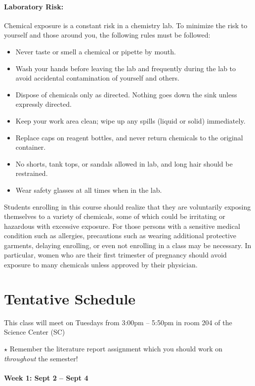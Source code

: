 \documentclass[12pt, letterpaper]{article}
\begin{document}
\paragraph{Laboratory Risk:}
Chemical exposure is a constant risk in a chemistry lab. To minimize the risk to yourself and those around you, the following rules must be followed:
\begin{itemize}
	\item Never taste or smell a chemical or pipette by mouth.
	\item Wash your hands before leaving the lab and frequently during the lab to avoid accidental contamination of yourself and others.
	\item Dispose of chemicals only as directed. Nothing goes down the sink unless expressly directed.
	\item Keep your work area clean; wipe up any spills (liquid or solid) immediately.
	\item Replace caps on reagent bottles, and never return chemicals to the original container.
	\item No shorts, tank tops, or sandals allowed in lab, and long hair should be restrained.
	\item Wear safety glasses at all times when in the lab.
\end{itemize}
Students enrolling in this course should realize that they are voluntarily exposing themselves to a variety of chemicals, some of which could be irritating or hazardous with excessive exposure.  For those persons with a sensitive medical condition such as allergies, precautions such as wearing additional protective garments, delaying enrolling, or even not enrolling in a class may be necessary.  In particular, women who are their first trimester of pregnancy should avoid exposure to many chemicals unless approved by their physician.

\section*{Tentative Schedule}
This class will meet on Tuesdays from 3:00pm -- 5:50pm in room 204 of the Science Center (SC)

\noindent
$\star$ Remember the literature report assignment which you should work on \emph{throughout} the semester!

\paragraph{Week 1: Sept 2 -- Sept 4}~
\end{document}

